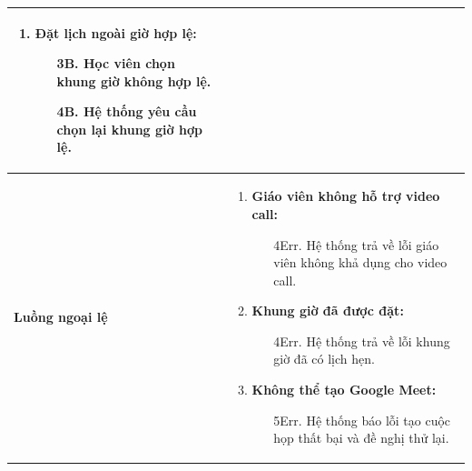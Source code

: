{\begin{tabularx}{\textwidth}{|>{\raggedright\arraybackslash}p{3.5cm}|>{\raggedright\arraybackslash}X|}
\begin{enumerate}
    \item \textbf{Đặt lịch ngoài giờ hợp lệ:}
    \begin{enumerate}
        \item[3B.] Học viên chọn khung giờ không hợp lệ.
        \item[4B.] Hệ thống yêu cầu chọn lại khung giờ hợp lệ.
    \end{enumerate}
\end{enumerate} \\
\hline
\textbf{Luồng ngoại lệ} &
\begin{enumerate}
    \item \textbf{Giáo viên không hỗ trợ video call:}
    \begin{enumerate}
        \item[4Err.] Hệ thống trả về lỗi giáo viên không khả dụng cho video call.
    \end{enumerate}
    \item \textbf{Khung giờ đã được đặt:}
    \begin{enumerate}
        \item[4Err.] Hệ thống trả về lỗi khung giờ đã có lịch hẹn.
    \end{enumerate}
    \item \textbf{Không thể tạo Google Meet:}
    \begin{enumerate}
        \item[5Err.] Hệ thống báo lỗi tạo cuộc họp thất bại và đề nghị thử lại.
    \end{enumerate}
\end{enumerate} \\
\hline
\end{tabularx}
}
